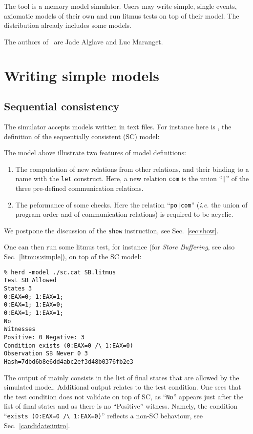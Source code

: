 
The tool \herd{} is a memory model simulator.
Users may write simple, single events,
axiomatic models of their own and run litmus tests on top
of their model.
The \herd{} distribution already includes some models.


The authors of~\herd{} are Jade Alglave and Luc Maranget.


\section{Writing simple models}

\subsection{Sequential consistency}
The simulator \herd{} accepts models written in text files.
For instance here is ,
the definition of the sequentially consistent (SC) model:

The model above illustrate two features of model definitions:
\begin{enumerate}
\item The computation of new relations from other relations,
and their binding to a name with the \verb+let+ construct.
Here, a new relation \verb+com+ is the union ``\texttt{|}'' of
the three pre-defined communication relations.
\item The peformance of some checks. Here the relation ``\verb+po|com+''
(\emph{i.e.} the union of program order  and of  communication
relations) is required to be acyclic.
\end{enumerate}
We postpone the discussion of the \verb+show+ instruction, see
Sec.~\ref{sec:show}.

One can then run some litmus test, for instance 
(for \emph{Store Buffering},
see also Sec.~\ref{litmus:simple}), on top of the SC model:
\begin{verbatim}
% herd -model ./sc.cat SB.litmus
Test SB Allowed
States 3
0:EAX=0; 1:EAX=1;
0:EAX=1; 1:EAX=0;
0:EAX=1; 1:EAX=1;
No
Witnesses
Positive: 0 Negative: 3
Condition exists (0:EAX=0 /\ 1:EAX=0)
Observation SB Never 0 3
Hash=7dbd6b8e6dd4abc2ef3d48b0376fb2e3
\end{verbatim}
The output of \herd{} mainly consists in
the list of final states that are allowed by the simulated model.
Additional output relates to the test condition.
One sees that the test condition does not validate on top of SC,
as ``\texttt{No}'' appears just after the list of final states
and as there is no ``Positive'' witness.
Namely, the condition ``\verb+exists (0:EAX=0 /\ 1:EAX=0)+''
reflects a non-SC behaviour, see Sec.~\ref{candidate:intro}.

